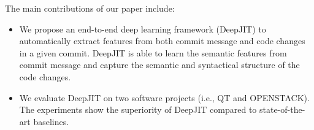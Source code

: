 
The main contributions of our paper include:
\begin{itemize}
    \item We propose an end-to-end deep learning framework (DeepJIT) to automatically extract features from both commit message and code changes in a given commit. DeepJIT is able to learn the semantic features from commit message and capture the semantic and syntactical structure of the code changes. 
    \item We evaluate DeepJIT on two software projects (i.e., QT and OPENSTACK). The  experiments show  the  superiority of DeepJIT compared to state-of-the-art baselines.
\end{itemize}
